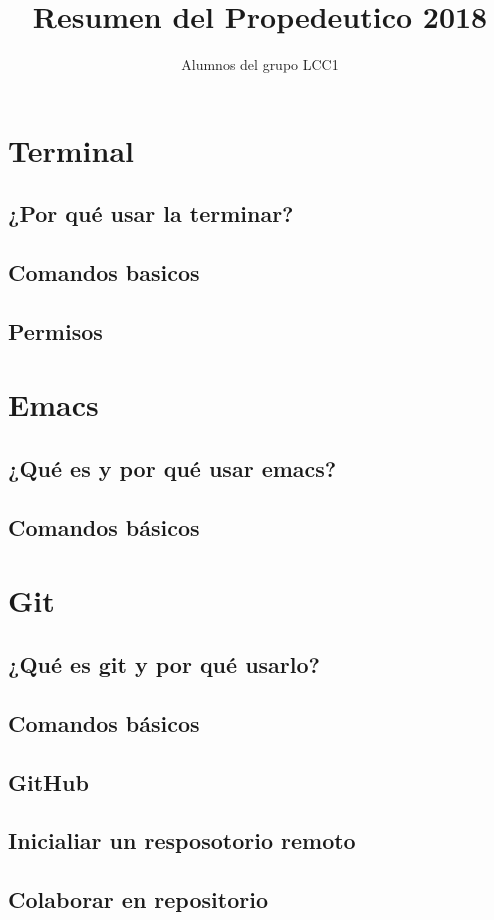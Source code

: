 \documentclass[11pt,letterpaper]{article}
\title{Resumen del Propedeutico 2018}
\author{Alumnos del grupo LCC1}
\begin{document}
\maketitle
\section{Terminal}
\subsection{¿Por qué usar la terminar?}
\subsection{Comandos basicos}
\subsection{Permisos}
\section{Emacs}
\subsection{¿Qué es y por qué usar emacs?}
\subsection{Comandos básicos}
\section{Git}
\subsection{¿Qué es git y por qué usarlo?}
\subsection{Comandos básicos}
\subsection{GitHub}
\subsection{Inicialiar un resposotorio remoto}
\subsection{Colaborar en repositorio}
\end{document}
